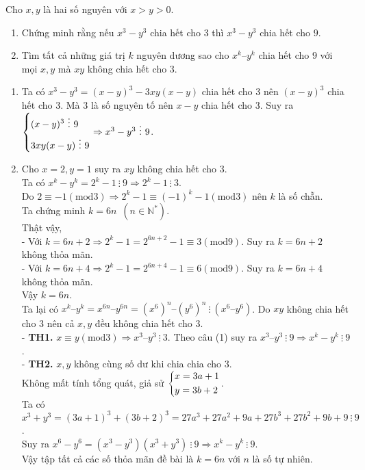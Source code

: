 \begin{ex}
	Cho $x, y$ là hai số nguyên với $x>y>0$.
	\begin{enumerate}    
		\item Chứng minh rằng nếu $x^3-y^3$ chia hết cho $3$ thì $x^3-y^3$ chia hết cho $9$.
		\item Tìm tất cả những giá trị $k$ nguyên dương sao cho $x^k – y^k$ chia hết cho $9$ với mọi $x, y$ mà $xy$ không chia hết cho $3$.
	\end{enumerate}
	\loigiai
	{
		\begin{enumerate}
			\item Ta có $x^3-y^3=(x-y)^3-3xy(x-y)$ chia hết cho $3$ nên $(x-y)^3$ chia hết cho $3$. Mà $3$ là số nguyên tố nên $x-y$ chia hết cho $3$. Suy ra $\heva{& (x-y)^3 \  \vdots \ 9 \\ & 3xy(x-y) \  \vdots \ 9} \Rightarrow x^3-y^3 \  \vdots \ 9$.
			\item  Cho $x=2, y=1$ suy ra $xy$ không chia hết cho $3$.\\
			Ta có $x^k - y^k=2^k-1 \  \vdots \ 9 \Rightarrow 2^k -1 \  \vdots \ 3$.\\
			Do $2 \equiv -1 (\text{mod} 3) \Rightarrow 2^k-1 \equiv  (-1)^k-1 (\text{mod} 3) $ nên $k$ là số chẵn. \\
			Ta chứng minh $k=6n \,\,\, (n \in \mathbb{N}^*)$.\\
			Thật vậy, \\
			-	Với $k=6n+2 \Rightarrow 2^k -1 = 2^{6n+2}-1 \equiv 3 (\text{mod} 9) $. Suy ra $k=6n+2$ không thỏa mãn.\\
			-	Với $k=6n+4 \Rightarrow 2^k -1 = 2^{6n+4}-1 \equiv 6 (\text{mod} 9) $. Suy ra $k=6n+4$ không thỏa mãn.\\
			Vậy $k=6n$. \\
			Ta lại có $x^k – y^k=x^{6n} – y^{6n}=(x^6)^n – (y^6)^n \  \vdots \ (x^6 – y^6)$. Do $xy$ không chia hết cho $3$ nên cả $x, y$ đều không chia hết cho $3$.\\
			-	{\bf TH1.} $x \equiv y (\text{mod} 3)  \Rightarrow x^3 –y^3 \  \vdots \ 3$. Theo câu (1) suy ra $x^3 –y^3 \  \vdots \ 9 \Rightarrow x^k-y^k \  \vdots \ 9$.\\
			-	{\bf TH2.} $x, y$ không cùng số dư khi chia chia cho $3$. \\
			Không mất tính tổng quát, giả sử $\left\{\begin{aligned}& x = 3a+1 \\& y=3b+2\end{aligned}\right.$.\\
			Ta có $x^3+y^3=(3a+1)^3+(3b+2)^3=27a^3+27a^2+9a+27b^3+27b^2+9b+9 \  \vdots \ 9$.\\
			Suy ra $x^6-y^6=(x^3-y^3)(x^3+y^3) \  \vdots \ 9 \Rightarrow x^k-y^k \  \vdots \ 9$.\\
			Vậy tập tất cả các số thỏa mãn đề bài là $k=6n$ với $n$ là số tự nhiên.
			
		\end{enumerate}
	}
\end{ex}
